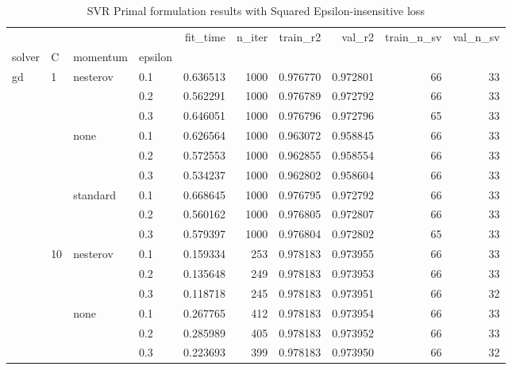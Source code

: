 \begin{table}[h!]
\centering
\caption{SVR Primal formulation results with Squared Epsilon-insensitive loss}
\label{primal_svr_squared_eps_cv_results}
\begin{tabular}{llllrrrrrr}
\toprule
          &     &   &     &  fit\_time &  n\_iter &  train\_r2 &    val\_r2 &  train\_n\_sv &  val\_n\_sv \\
solver & C & momentum & epsilon &           &         &           &           &             &           \\
\midrule
gd & 1   & nesterov & 0.1 &  0.636513 &    1000 &  0.976770 &  0.972801 &          66 &        33 \\
          &     &   & 0.2 &  0.562291 &    1000 &  0.976789 &  0.972792 &          66 &        33 \\
          &     &   & 0.3 &  0.646051 &    1000 &  0.976796 &  0.972796 &          65 &        33 \\
          &     & none & 0.1 &  0.626564 &    1000 &  0.963072 &  0.958845 &          66 &        33 \\
          &     &   & 0.2 &  0.572553 &    1000 &  0.962855 &  0.958554 &          66 &        33 \\
          &     &   & 0.3 &  0.534237 &    1000 &  0.962802 &  0.958604 &          66 &        33 \\
          &     & standard & 0.1 &  0.668645 &    1000 &  0.976795 &  0.972792 &          66 &        33 \\
          &     &   & 0.2 &  0.560162 &    1000 &  0.976805 &  0.972807 &          66 &        33 \\
          &     &   & 0.3 &  0.579397 &    1000 &  0.976804 &  0.972802 &          65 &        33 \\
          & 10  & nesterov & 0.1 &  0.159334 &     253 &  0.978183 &  0.973955 &          66 &        33 \\
          &     &   & 0.2 &  0.135648 &     249 &  0.978183 &  0.973953 &          66 &        33 \\
          &     &   & 0.3 &  0.118718 &     245 &  0.978183 &  0.973951 &          66 &        32 \\
          &     & none & 0.1 &  0.267765 &     412 &  0.978183 &  0.973954 &          66 &        33 \\
          &     &   & 0.2 &  0.285989 &     405 &  0.978183 &  0.973952 &          66 &        33 \\
          &     &   & 0.3 &  0.223693 &     399 &  0.978183 &  0.973950 &          66 &        32 \\

\end{tabular}
\end{table}
